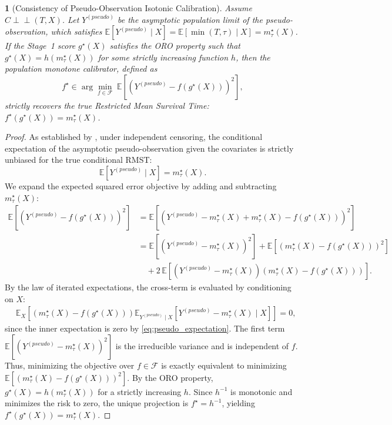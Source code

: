 \documentclass[11pt]{article}
\theoremstyle{plain}
\theoremstyle{plain}
\theoremstyle{plain}
\theoremstyle{plain}
\newtheorem{theorem}{\protect\theoremname}
\theoremstyle{plain}
\theoremstyle{plain}
\theoremstyle{plain}
\providecommand{\theoremname}{Theorem}
\begin{document}
\begin{theorem}[Consistency of Pseudo-Observation Isotonic Calibration]
\label{thm:pseudo_iso}
Assume $C \perp\!\!\!\perp (T, X)$. Let $Y^{(pseudo)}$ be the asymptotic population limit of the pseudo-observation, which satisfies $\mathbb{E}[Y^{(pseudo)} \mid X] = \mathbb{E}[\min(T, \tau) \mid X] = m^{\star}_{\tau}(X)$. If the Stage~1 score $g^\star(X)$ satisfies the ORO property such that $g^\star(X) = h(m^{\star}_{\tau}(X))$ for some strictly increasing function $h$, then the population monotone calibrator, defined as
\[
f^{\star} \in \arg\min_{f \in \mathcal{F}} \ \mathbb{E}\left[\left(Y^{(pseudo)} - f(g^\star(X))\right)^2\right],
\]
strictly recovers the true Restricted Mean Survival Time: $f^{\star}(g^\star(X)) = m^{\star}_{\tau}(X)$.
\end{theorem}

\begin{proof}
As established by \citet{graw2009pseudo}, under independent censoring, the conditional expectation of the asymptotic pseudo-observation given the covariates is strictly unbiased for the true conditional RMST:
\begin{equation}
\label{eq:pseudo_expectation}
\mathbb{E}[Y^{(pseudo)} \mid X] = m^{\star}_{\tau}(X).
\end{equation}
We expand the expected squared error objective by adding and subtracting $m^{\star}_{\tau}(X)$:
\begin{align*}
\mathbb{E}\left[\left(Y^{(pseudo)} - f(g^\star(X))\right)^2\right] 
&= \mathbb{E}\left[\left(Y^{(pseudo)} - m^{\star}_{\tau}(X) + m^{\star}_{\tau}(X) - f(g^\star(X))\right)^2\right] \\
&= \mathbb{E}\left[\left(Y^{(pseudo)} - m^{\star}_{\tau}(X)\right)^2\right] + \mathbb{E}\left[\left(m^{\star}_{\tau}(X) - f(g^\star(X))\right)^2\right] \\
&\quad + 2\,\mathbb{E}\left[\left(Y^{(pseudo)} - m^{\star}_{\tau}(X)\right)\left(m^{\star}_{\tau}(X) - f(g^\star(X))\right)\right].
\end{align*}
By the law of iterated expectations, the cross-term is evaluated by conditioning on $X$:
\begin{align*}
&\mathbb{E}_{X}\left[\left(m^{\star}_{\tau}(X) - f(g^\star(X))\right) \mathbb{E}_{Y^{(pseudo)}\mid X}\left[Y^{(pseudo)} - m^{\star}_{\tau}(X) \mid X\right]\right] = 0,
\end{align*}
since the inner expectation is zero by \eqref{eq:pseudo_expectation}. The first term $\mathbb{E}[(Y^{(pseudo)} - m^{\star}_{\tau}(X))^2]$ is the irreducible variance and is independent of $f$. Thus, minimizing the objective over $f \in \mathcal{F}$ is exactly equivalent to minimizing $\mathbb{E}[(m^{\star}_{\tau}(X) - f(g^\star(X)))^2]$. By the ORO property, $g^\star(X) = h(m^{\star}_{\tau}(X))$ for a strictly increasing $h$. Since $h^{-1}$ is monotonic and minimizes the risk to zero, the unique projection is $f^{\star} = h^{-1}$, yielding $f^{\star}(g^\star(X)) = m^{\star}_{\tau}(X)$.
\end{proof}
\end{document}
